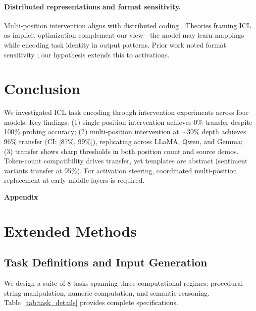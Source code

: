 \documentclass{article}
\begin{document}
\paragraph{Distributed representations and format sensitivity.}
Multi-position intervention aligns with distributed coding \citep{hinton1986distributed,elhage2022superposition}. Theories framing ICL as implicit optimization \citep{dai2022can,vonoswald2023transformers,akyurek2023what} complement our view---the model may learn mappings while encoding task identity in output patterns. Prior work noted format sensitivity \citep{lu2022fantastically,zhao2021calibrate,min2022rethinking}; our hypothesis extends this to activations.

\section{Conclusion}
\label{sec:conclusion}

We investigated ICL task encoding through intervention experiments across four models. Key findings: (1) single-position intervention achieves 0\% transfer despite 100\% probing accuracy; (2) multi-position intervention at $\sim$30\% depth achieves 96\% transfer (CI: [87\%, 99\%]), replicating across LLaMA, Qwen, and Gemma; (3) transfer shows sharp thresholds in both position count and source demos. Token-count compatibility drives transfer, yet templates are abstract (sentiment variants transfer at 95\%). For activation steering, coordinated multi-position replacement at early-middle layers is required.




\newpage
\appendix
\begin{center}
\Large\textbf{Appendix}
\end{center}
\vspace{1em}

\section{Extended Methods}
\label{app:methods}

\subsection{Task Definitions and Input Generation}

We design a suite of 8 tasks spanning three computational regimes: procedural string manipulation, numeric computation, and semantic reasoning. Table~\ref{tab:task_details} provides complete specifications.
\end{document}
